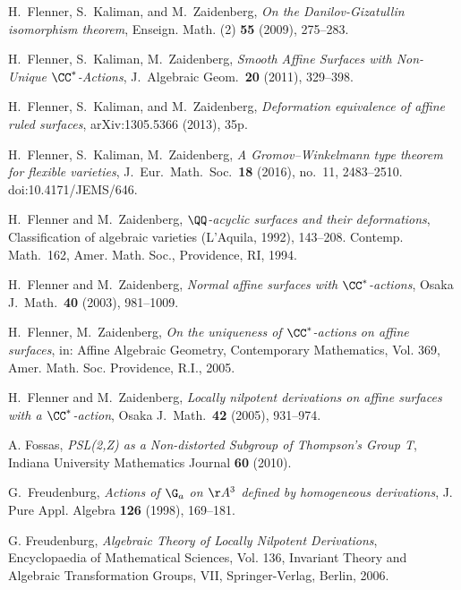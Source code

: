H.~Flenner, S.~Kaliman, and M.~Zaidenberg,
\emph{On the Danilov-Gizatullin isomorphism theorem},
 Enseign. Math. (2) \textbf{55} (2009), 275--283.

H.~Flenner, S.~Kaliman, M.~Zaidenberg, \emph{Smooth Affine Surfaces with Non-Unique
$\CC^*$-Actions},
J.\ Algebraic Geom.\ \textbf{20} (2011), 329--398.

H.~Flenner, S.~Kaliman, and M.~Zaidenberg,
\emph{Deformation equivalence of affine ruled surfaces},
arXiv:1305.5366 (2013), 35p.

H.~Flenner, S.~Kaliman, M.~Zaidenberg,
\emph{A Gromov--Winkelmann type theorem for flexible varieties},
J.\ Eur.\ Math.\ Soc.\ \textbf{18} (2016), no.~11, 2483--2510.
doi:10.4171/JEMS/646.

H.~Flenner and M.~Zaidenberg,
\emph{$\QQ$-acyclic surfaces and their deformations},
Classification of algebraic varieties (L'Aquila, 1992), 143--208.
Contemp. Math.\ 162, Amer. Math. Soc.,
Providence, RI, 1994.

H.~Flenner and M.~Zaidenberg,
\emph{Normal affine surfaces with $\CC^*$-actions},
Osaka J.\ Math.\ \textbf{40} (2003), 981--1009.

H.~Flenner, M.~Zaidenberg, \emph{On the uniqueness of $\CC^*$-actions on affine surfaces},  in: Affine Algebraic Geometry, Contemporary Mathematics, Vol. 369, Amer. Math. Soc. Providence, R.I., 2005.

H.~Flenner and M.~Zaidenberg,
\emph{Locally nilpotent derivations on
affine surfaces with a ${\CC}^*$-action},
Osaka J.\ Math.\ \textbf{42} (2005), 931--974.


A. Fossas, \emph{PSL(2,Z) as a Non-distorted Subgroup of Thompson's Group T}, Indiana University Mathematics Journal \textbf{60} (2010).


G.~Freudenburg, \emph{Actions of $\G_a$ on $\AA^3$ defined by homogeneous derivations}, J. Pure Appl. Algebra \textbf{126} (1998), 169--181.

G. Freudenburg, \emph{Algebraic Theory of Locally Nilpotent Derivations}, Encyclopaedia of Mathematical Sciences, Vol. 136, Invariant Theory and Algebraic Transformation Groups, VII, Springer-Verlag, Berlin, 2006.

